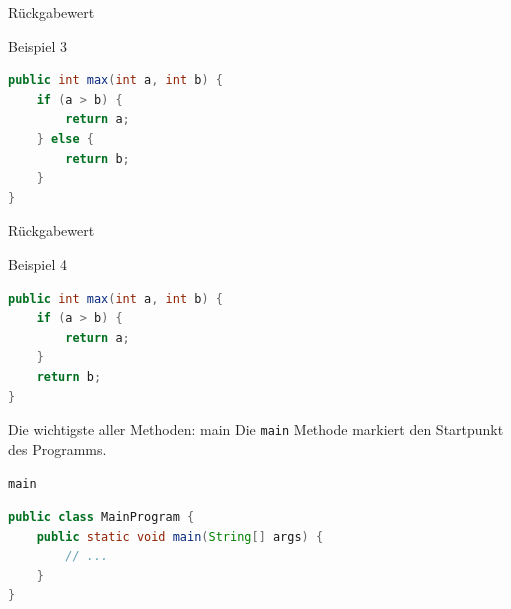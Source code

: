 \documentclass[18pt]{beamer}
\begin{document}
\begin{frame}[fragile]{Rückgabewert}
    \begin{exampleblock}{Beispiel 3}
        \begin{lstlisting}[language=Java]
public int max(int a, int b) {
    if (a > b) {
        return a;
    } else {
        return b;
    }
}
        \end{lstlisting}
    \end{exampleblock}
\end{frame}

\begin{frame}[fragile]{Rückgabewert}
    \begin{exampleblock}{Beispiel 4}
        \begin{lstlisting}[language=Java]
public int max(int a, int b) {
    if (a > b) {
        return a;
    }
    return b;
}
        \end{lstlisting}
    \end{exampleblock}
\end{frame}

\begin{frame}[fragile]{Die wichtigste aller Methoden: main}
    Die \texttt{main} Methode markiert den Startpunkt des Programms.
    \begin{exampleblock}{\texttt{main}}
        \begin{lstlisting}[language=Java]
public class MainProgram {
    public static void main(String[] args) {
        // ...
    }
}
        \end{lstlisting}

    \end{exampleblock}

\end{frame}

\appendix
\beginbackup
\end{document}
